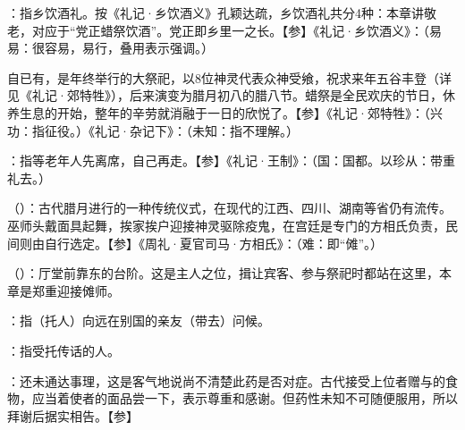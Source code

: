 {
\item {}：指乡饮酒礼。按《礼记·乡饮酒义》孔颖达疏，乡饮酒礼共分4种：本章讲敬老，对应于“党正蜡祭饮酒”。党正即乡里一之长。【参】《礼记·乡饮酒义》：（易易：很容易，易行，叠用表示强调。）

自已有，是年终举行的大祭祀，以8位神灵代表众神受飨，祝求来年五谷丰登（详见《礼记·郊特牲》），后来演变为腊月初八的腊八节。蜡祭是全民欢庆的节日，休养生息的开始，整年的辛劳就消融于一日的欣悦了。【参】《礼记·郊特牲》：（兴功：指征役。）《礼记·杂记下》：（未知：指不理解。）

\item {}：指等老年人先离席，自己再走。【参】《礼记·王制》：（国：国都。以珍从：带重礼去。）
}
{}


{
\item {}（）：古代腊月进行的一种传统仪式，在现代的江西、四川、湖南等省仍有流传。巫师头戴面具起舞，挨家挨户迎接神灵驱除疫鬼，在宫廷是专门的方相氏负责，民间则由自行选定。【参】《周礼·夏官司马·方相氏》：（难：即“傩”。）
\item {}（）：厅堂前靠东的台阶。这是主人之位，揖让宾客、参与祭祀时都站在这里，本章是郑重迎接傩师。
}
{}


{
\item {}：指（托人）向远在别国的亲友（带去）问候。
\item {}：指受托传话的人。
}
{}


{
\item {}：还未通达事理，这是客气地说尚不清楚此药是否对症。古代接受上位者赠与的食物，应当着使者的面品尝一下，表示尊重和感谢。但药性未知不可随便服用，所以拜谢后据实相告。【参】
}
{}


